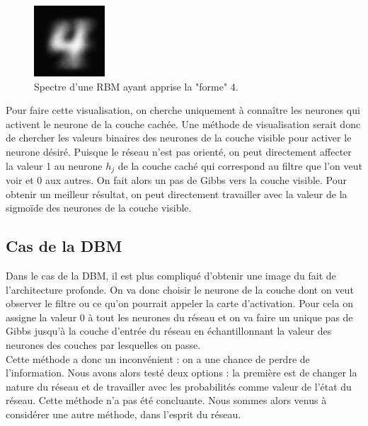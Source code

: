 \documentclass[a4paper,oneside]{report}
\begin{document}
\begin{figure}
                    \begin{center}
                        \includegraphics[width=75pt]{Images/spectres-01.png}
                    \end{center}
                    \caption{Spectre d'une RBM ayant apprise la "forme" 4.}
                \end{figure}

Pour faire cette visualisation, on cherche uniquement à connaître les neurones qui activent le neurone de la couche cachée. 
Une méthode de visualisation serait donc de chercher les valeurs binaires  des neurones de la couche visible pour 
activer le neurone désiré. Puisque le réseau n'est pas orienté, on peut directement affecter la valeur 1 au neurone \textit{$h_{j}$} 
de la couche caché qui correspond au filtre que l'on veut voir et 0 aux autres. On fait alors un pas de Gibbs vers la couche visible. Pour obtenir un meilleur résultat, 
on peut directement travailler avec la valeur de la sigmoïde des neurones de la couche visible.

\subsection{Cas de la DBM}

Dans le cas de la DBM, il est plus compliqué d'obtenir une image du fait de l'architecture profonde. On va donc choisir le neurone de la couche dont  on veut observer le filtre ou ce qu'on pourrait appeler la carte d'activation. Pour cela on assigne la valeur 0 à tout les neurones du réseau et on va faire un unique pas de Gibbs jusqu'à la couche d'entrée du réseau en échantillonnant la valeur des neurones des couches par lesquelles on passe.\\

Cette méthode a donc un inconvénient : on a une chance de perdre de l'information. Nous avons alors testé deux options : la première est de changer la nature du réseau et de travailler avec les probabilités comme valeur de l'état du réseau. Cette méthode n'a pas été concluante. Nous sommes alors venus à considérer une autre méthode, dans l'esprit du réseau. \\
\end{document}
